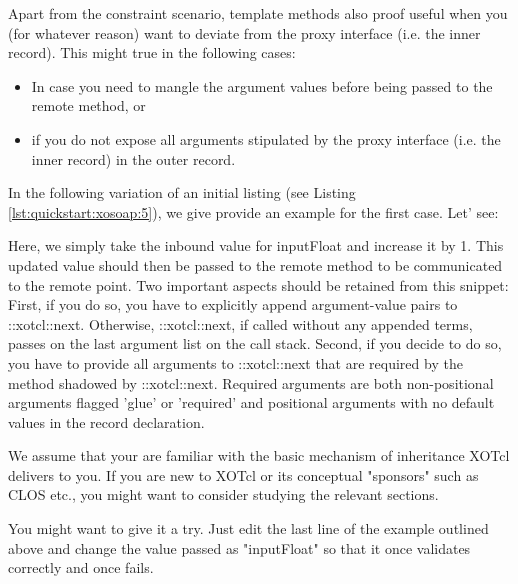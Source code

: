 

Apart from the constraint scenario, template methods also proof useful when you (for whatever reason) want to deviate from the proxy interface (i.e. the inner record). This might true in the following cases:
\begin{itemize}
\item In case you need to mangle the argument values before being passed to the remote method, or
\item if you do not expose all arguments stipulated by the proxy interface (i.e. the inner record) in the outer record.
\end{itemize}

In the following variation of an initial listing (see Listing \ref{lst:quickstart:xosoap:5}), we give provide an example for the first case. Let' see:



Here, we simply take the inbound value for inputFloat and increase it by 1. This updated value should then be passed to the remote method to be communicated to the remote point. Two important aspects should be retained from this snippet: First, if you do so, you have to explicitly append argument-value pairs to ::xotcl::next. Otherwise, ::xotcl::next, if called without any appended terms, passes on the last argument list on the call stack. Second, if you decide to do so, you have to provide all arguments to ::xotcl::next that are required by the method shadowed by ::xotcl::next. Required arguments are both non-positional arguments flagged 'glue' or 'required' and positional arguments with no default values in the record declaration.


\begin{hints}
\item We assume that your are familiar with the basic mechanism of inheritance XOTcl delivers to you. If you are new to XOTcl or its conceptual "sponsors" such as CLOS etc., you might want to consider studying the relevant sections.
\item You might want to give it a try. Just edit the last line of the example outlined above and change the value passed as "inputFloat" so that it once validates correctly and once fails.
\end{hints}

